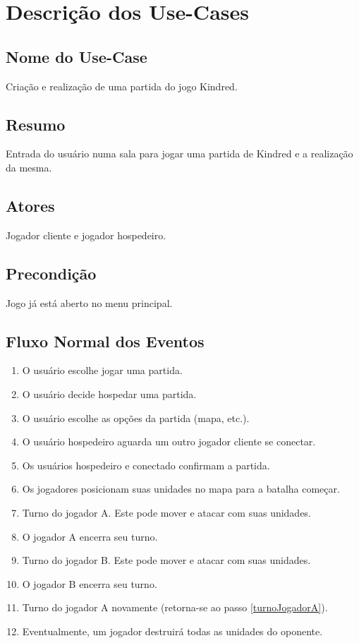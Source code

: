 \section{Descrição dos Use-Cases}


\subsection{Nome do Use-Case}
    Criação e realização de uma partida do jogo Kindred.


\subsection{Resumo}
    Entrada do usuário numa sala para jogar uma partida de Kindred
    e a realização da mesma.


\subsection{Atores}
        Jogador cliente e jogador hospedeiro.


\subsection{Precondição}
    Jogo já está aberto no menu principal.


\subsection{Fluxo Normal dos Eventos}
    \begin{enumerate}
        \item \label{escolhePartida} O usuário escolhe jogar uma partida.
        \item \label{decideHospedar} O usuário decide hospedar uma partida.
        \item O usuário escolhe as opções da partida (mapa, etc.).
        \item O usuário hospedeiro aguarda um outro jogador cliente se conectar.
        \item \label{salaConfirmada} Os usuários hospedeiro e conectado confirmam a partida.
        \item Os jogadores posicionam suas unidades no mapa para a batalha começar.
        \item \label{turnoJogadorA} Turno do jogador A. Este pode mover e atacar com suas unidades.
        \item O jogador A encerra seu turno.
        \item Turno do jogador B. Este pode mover e atacar com suas unidades.
        \item O jogador B encerra seu turno.
        \item Turno do jogador A novamente (retorna-se ao passo \ref{turnoJogadorA}).
        \item \label{exercitoDestruido} Eventualmente, um jogador destruirá todas as unidades do oponente.
    \end{enumerate}


